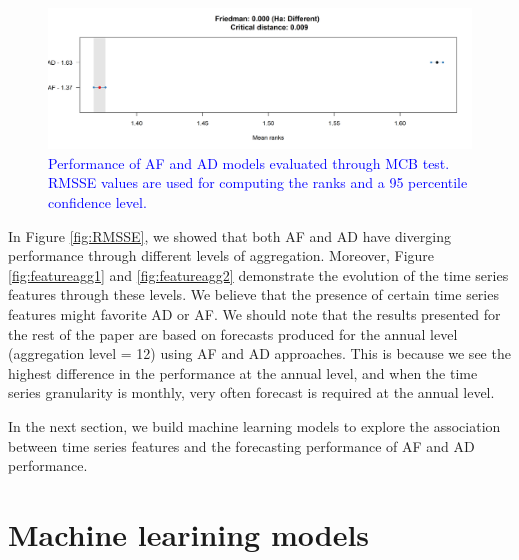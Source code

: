 \documentclass[preprint, 3p,
authoryear]{elsarticle} %
\begin{document}
\begin{figure}[H]

{\centering \includegraphics[width=1\linewidth]{img/300dpi/Fig_MCB} 

}

\caption{ \textcolor{blue}{Performance of AF and AD models evaluated through MCB test. RMSSE values are used for computing the ranks and a 95 percentile confidence level.}}\label{fig:MCB}
\end{figure}

In Figure \ref{fig:RMSSE}, we showed that both AF and AD have diverging
performance through different levels of aggregation. Moreover, Figure
\ref{fig:featureagg1} and \ref{fig:featureagg2} demonstrate the
evolution of the time series features through these levels. We believe
that the presence of certain time series features might favorite AD or
AF. We should note that the results presented for the rest of the paper
are based on forecasts produced for the annual level (aggregation level
= 12) using AF and AD approaches. This is because we see the highest
difference in the performance at the annual level, and when the time
series granularity is monthly, very often forecast is required at the
annual level.

In the next section, we build machine learning models to explore the
association between time series features and the forecasting performance
of AF and AD performance.

\hypertarget{ml}{%
\section{Machine learining models}\label{ml}}
\end{document}
